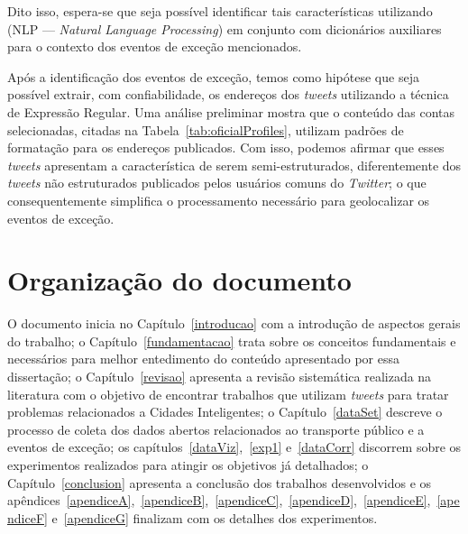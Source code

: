 \documentclass[
	12pt,				%
	oneside,			%
	a4paper,			%
	english,			%
	brazil				%
	]{abntex2ppgsi}
\begin{document}
{\begin{enumerate}
\end{enumerate}

Dito isso, espera-se que seja possível identificar tais características utilizando  (NLP --- \textit{Natural Language Processing}) em conjunto com dicionários auxiliares para o contexto dos eventos de exceção mencionados.

Após a identificação dos eventos de exceção, temos como hipótese que seja possível extrair, com confiabilidade, os endereços dos \textit{tweets} utilizando a técnica de Expressão Regular. Uma análise preliminar mostra que o conteúdo das contas selecionadas, citadas na Tabela~\ref{tab:oficialProfiles}, utilizam padrões de formatação para os endereços publicados. Com isso, podemos afirmar que esses \textit{tweets} apresentam a característica de serem semi-estruturados, diferentemente dos \textit{tweets} não estruturados publicados pelos usuários comuns do \textit{Twitter}; o que consequentemente simplifica o processamento necessário para geolocalizar os eventos de exceção.

\section{Organização do documento}
\label{docOrg}

O  documento inicia no Capítulo~\ref{introducao} com a introdução de aspectos gerais do trabalho; o Capítulo~\ref{fundamentacao} trata sobre os conceitos fundamentais e necessários para melhor entedimento do conteúdo apresentado por essa dissertação; o  Capítulo~\ref{revisao} apresenta a revisão sistemática realizada na literatura com o objetivo de encontrar trabalhos que utilizam \textit{tweets} para tratar problemas relacionados a Cidades Inteligentes; o Capítulo~\ref{dataSet} descreve o processo de coleta dos dados abertos relacionados ao transporte público e a eventos de exceção; os capítulos~\ref{dataViz},~\ref{exp1} e~\ref{dataCorr} discorrem sobre os experimentos realizados para atingir os objetivos já detalhados; o Capítulo~\ref{conclusion} apresenta a conclusão dos trabalhos desenvolvidos e os apêndices~\ref{apendiceA},~\ref{apendiceB},~\ref{apendiceC},~\ref{apendiceD},~\ref{apendiceE},~\ref{apendiceF} e~\ref{apendiceG} finalizam com os detalhes dos experimentos.

}
\end{document}
